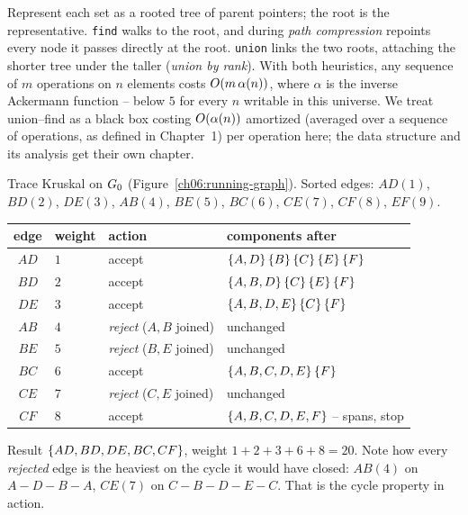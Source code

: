 Represent each set as a rooted tree of parent pointers; the root is the representative. \texttt{find} walks to the root, and during \emph{path compression} repoints every node it passes directly at the root. \texttt{union} links the two roots, attaching the shorter tree under the taller (\emph{union by rank}). With both heuristics, any sequence of $m$ operations on $n$ elements costs $O(m\,\alpha(n))$, where $\alpha$ is the inverse Ackermann function -- below $5$ for every $n$ writable in this universe. We treat union--find as a black box costing $O(\alpha(n))$ amortized (averaged over a sequence of operations, as defined in Chapter~1) per operation here; the data structure and its analysis get their own chapter.

\begin{labbox}
Trace Kruskal on $G_0$ (Figure~\ref{ch06:running-graph}). Sorted edges:
$AD(1)$, $BD(2)$, $DE(3)$, $AB(4)$, $BE(5)$, $BC(6)$, $CE(7)$, $CF(8)$, $EF(9)$.

\begin{center}
\begin{tabular}{clll}
\toprule
edge & weight & action & components after \\
\midrule
$AD$ & $1$ & accept & $\{A,D\}\,\{B\}\,\{C\}\,\{E\}\,\{F\}$ \\
$BD$ & $2$ & accept & $\{A,B,D\}\,\{C\}\,\{E\}\,\{F\}$ \\
$DE$ & $3$ & accept & $\{A,B,D,E\}\,\{C\}\,\{F\}$ \\
$AB$ & $4$ & \emph{reject} ($A,B$ joined) & unchanged \\
$BE$ & $5$ & \emph{reject} ($B,E$ joined) & unchanged \\
$BC$ & $6$ & accept & $\{A,B,C,D,E\}\,\{F\}$ \\
$CE$ & $7$ & \emph{reject} ($C,E$ joined) & unchanged \\
$CF$ & $8$ & accept & $\{A,B,C,D,E,F\}$ -- spans, stop \\
\bottomrule
\end{tabular}
\end{center}

Result $\{AD,BD,DE,BC,CF\}$, weight $1+2+3+6+8=20$. Note how every \emph{rejected} edge is the heaviest on the cycle it would have closed: $AB(4)$ on $A\!-\!D\!-\!B\!-\!A$, $CE(7)$ on $C\!-\!B\!-\!D\!-\!E\!-\!C$. That is the cycle property in action.
\end{labbox}

